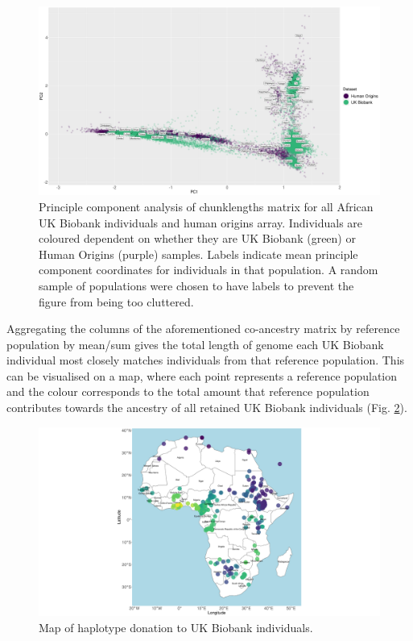 \begin{figure}[htp]
    \centering
    \includegraphics[width=1.0\textwidth]{../images/chapter3/PCA_chunklengths_HumanOrigins_UKBiobank.png}
    \caption{Principle component analysis of chunklengths matrix for all African UK Biobank individuals and human origins array. Individuals are coloured dependent on whether they are UK Biobank (green) or Human Origins (purple) samples. Labels indicate mean principle component coordinates for individuals in that population. A random sample of populations were chosen to have labels to prevent the figure from being too cluttered.}
    \label{fig:/PCA_chunklengths_HumanOrigins_UKBiobank}
\end{figure}

Aggregating the columns of the aforementioned co-ancestry matrix by reference population by mean/sum gives the total length of genome each UK Biobank individual most closely matches individuals from that reference population. This can be visualised on a map, where each point represents a reference population and the colour corresponds to the total amount that reference population contributes towards the ancestry of all retained UK Biobank individuals (Fig. \ref{fig:haplotype_sharing_map_zoomed_II}).

\begin{figure}[htp]
    \centering
    \includegraphics[width=1.0\textwidth]{../images/chapter3/haplotype_sharing_map_zoomed_II.png}
    \caption{Map of haplotype donation to UK Biobank individuals. }
    \label{fig:haplotype_sharing_map_zoomed_II}
\end{figure}

